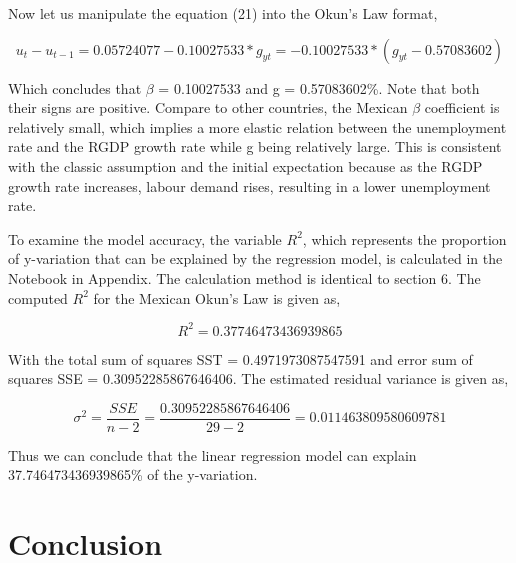 \documentclass{article}
\begin{document}
    {Now let us manipulate the equation (21) into the Okun's Law format,}

    \begin{equation}
        u_t - u_{t-1} = 0.05724077 - 0.10027533*g_{yt} = - 0.10027533 * (g_{yt} - 0.57083602)
    \end{equation}

    {Which concludes that $\beta$ = 0.10027533 and g = 0.57083602\%. Note that both their signs are positive. Compare to other countries, the Mexican $\beta$ coefficient is relatively small, which implies a more elastic relation between the unemployment rate and the RGDP growth rate while g being relatively large. This is consistent with the classic assumption and the initial expectation because as the RGDP growth rate increases, labour demand rises, resulting in a lower unemployment rate.}

    {To examine the model accuracy, the variable $R^2$, which represents the proportion of y-variation that can be explained by the regression model, is calculated in the Notebook in Appendix. The calculation method is identical to section 6. The computed $R^{2}$ for the Mexican Okun's Law is given as,}

    \begin{equation}
        R^{2} = 0.37746473436939865
    \end{equation}

    {With the total sum of squares SST = 0.4971973087547591 and error sum of squares SSE = 0.30952285867646406. The estimated residual variance is given as, }

    \begin{equation}
        \sigma^2 = \frac{SSE}{n - 2} = \frac{0.30952285867646406}{29 - 2} = 0.011463809580609781
    \end{equation}

    {Thus we can conclude that the linear regression model can explain 37.746473436939865\% of the y-variation.}

\pagebreak

\section{Conclusion}

    \hspace{5mm}{This report provides the mathematical estimations of the Mexican Philips Curve and the Mexican Okun's Law as below,}

    \vspace{5mm}
    
\end{document}
